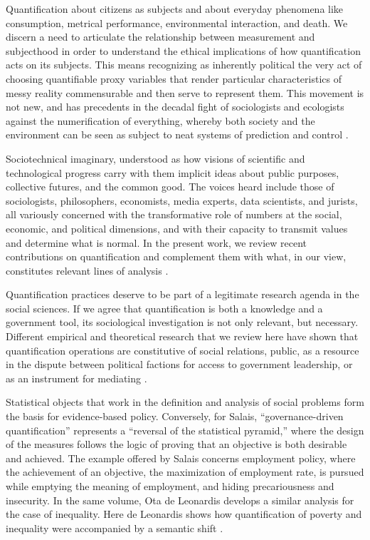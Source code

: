 Quantification about citizens as subjects and about everyday phenomena like consumption, metrical performance, environmental interaction, and death. We discern a need to articulate the relationship between measurement and subjecthood in order to understand the ethical implications of how quantification acts on its subjects. This means recognizing as inherently political the very act of choosing quantifiable proxy variables that render particular characteristics of messy reality commensurable and then serve to represent them. This movement is not new, and has precedents in the decadal fight of sociologists and ecologists against the numerification of everything, whereby both society and the environment can be seen as subject to neat systems of prediction and control \cite{10_1057_s41599_020_0396_5}.

Sociotechnical imaginary, understood as how visions of scientific and technological progress carry with them implicit ideas about public purposes, collective futures, and the common good. The voices heard include those of sociologists, philosophers, economists, media experts, data scientists, and jurists, all variously concerned with the transformative role of numbers at the social, economic, and political dimensions, and with their capacity to transmit values and determine what is normal. In the present work, we review recent contributions on quantification and complement them with what, in our view, constitutes relevant lines of analysis \cite{10_1057_s41599_020_0396_5}.

Quantification practices deserve to be part of a legitimate research agenda in the social sciences. If we agree that quantification is both a knowledge and a government tool, its sociological investigation is not only relevant, but necessary. Different empirical and theoretical research that we review here have shown that quantification operations are constitutive of social relations, public, as a resource in the dispute between political factions for access to government leadership, or as an instrument for mediating \cite{10_1057_s41599_020_0396_5}.

Statistical objects that work in the definition and analysis of social problems form the basis for evidence-based policy. Conversely, for Salais, “governance-driven quantification” represents a “reversal of the statistical pyramid,” where the design of the measures follows the logic of proving that an objective is both desirable and achieved. The example offered by Salais concerns employment policy, where the achievement of an objective, the maximization of employment rate, is pursued while emptying the meaning of employment, and hiding precariousness and insecurity. In the same volume, Ota de Leonardis develops a similar analysis for the case of inequality. Here de Leonardis shows how quantification of poverty and inequality were accompanied by a semantic shift \cite{10_1057_s41599_020_0396_5}.

